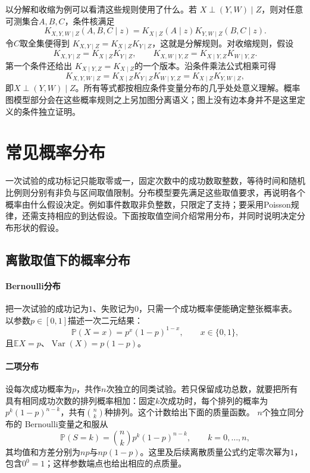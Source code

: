 以分解和收缩为例可以看清这些规则使用了什么。若
\(X\perp(Y,W)\mid Z\)，则对任意可测集合\(A,B,C\)，条件核满足
\[
  K_{X,Y,W\mid Z}(A,B,C\mid z)
  =K_{X\mid Z}(A\mid z)K_{Y,W\mid Z}(B,C\mid z).
\]
令\(C\)取全集便得到
\(K_{X,Y\mid Z}=K_{X\mid Z}K_{Y\mid Z}\)，这就是分解规则。对收缩规则，假设
\[
  K_{X,Y\mid Z}=K_{X\mid Z}K_{Y\mid Z},
  \qquad
  K_{X,W\mid Y,Z}=K_{X\mid Y,Z}K_{W\mid Y,Z}.
\]
第一个条件还给出
\(K_{X\mid Y,Z}=K_{X\mid Z}\)的一个版本。沿条件乘法公式相乘可得
\[
  K_{X,Y,W\mid Z}
  =K_{X\mid Z}K_{Y\mid Z}K_{W\mid Y,Z}
  =K_{X\mid Z}K_{Y,W\mid Z},
\]
即\(X\perp(Y,W)\mid Z\)。所有等式都按相应条件变量分布的几乎处处意义理解。概率图模型部分会在这些概率规则之上另加图分离语义；图上没有边本身并不是这里定义的条件独立证明。

\section{常见概率分布}
\label{sec:probability-common-distributions}
\label{sec:probability-families-transformations}
一次试验的成功标记只能取零或一，固定次数中的成功数取整数，等待时间和随机比例则分别有非负与区间取值限制。分布模型要先满足这些取值要求，再说明各个概率由什么假设决定。例如事件数取非负整数，只限定了支持；要采用Poisson规律，还需支持相应的到达假设。下面按取值空间介绍常用分布，并同时说明决定分布形状的假设。

\subsection{离散取值下的概率分布}
\paragraph{Bernoulli分布}
把一次试验的成功记为\(1\)、失败记为\(0\)，只需一个成功概率便能确定整张概率表。
以参数\(p\in[0,1]\)描述一次二元结果：
\[ \mathbb{P}(X=x)=p^x(1-p)^{1-x},
  \qquad x\in\{0,1\}, \]
且\(\mathbb{E}X=p\)、\(\operatorname{Var}(X)=p(1-p)\)。

\paragraph{二项分布}
设每次成功概率为\(p\)，共作\(n\)次独立的同类试验。若只保留成功总数，就要把所有具有相同成功次数的排列概率相加：固定\(k\)次成功时，每个排列的概率为\(p^k(1-p)^{n-k}\)，共有\(\binom nk\)种排列。这个计数给出下面的质量函数。
\(n\)个独立同分布的
Bernoulli变量之和服从
\[ \mathbb{P}(S=k)
  =\binom{n}{k}p^k(1-p)^{n-k},\qquad k=0,\ldots,n, \]
其均值和方差分别为\(np\)与\(np(1-p)\)。这里及后续离散质量公式约定零次幂为\(1\)，包含\(0^0=1\)；这样参数端点也给出相应的点质量。

